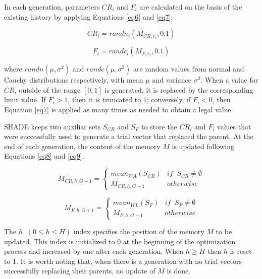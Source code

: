 \documentclass[review]{elsarticle}
\begin{document}
In each generation, parameters $CR_i$ and $F_i$ are calculated on the basis of the existing history by applying Equations \eqref{eq6} and \eqref{eq7}:

\begin{equation}
CR_i = randn_i(M_{CR,r_i}, 0.1)
\label{eq6}
\end{equation}

\begin{equation}
F_i = randc_i(M_{F,r_i}, 0.1)
\label{eq7}
\end{equation}

where $randn(\mu, \sigma^2)$ and $randc(\mu, \sigma^2)$ are random values from normal and Cauchy distributions respectively, with mean $\mu$ and variance $\sigma^2$. When a value for $CR_i$ outside of the range $[0,1]$ is generated, it is replaced by the corresponding limit value. If $F_i > 1$, then it is truncated to $1$; conversely, if $F_i < 0$, then Equation \eqref{eq7} is applied as many times as needed to obtain a legal value.

SHADE keeps two auxiliar sets $S_{CR}$ and $S_F$ to store the $CR_i$ and $F_i$ values that were successfully used to generate a trial vector that replaced the parent. At the end of each generation, the content of the memory $M$ is updated following Equations \eqref{eq8} and \eqref{eq9}.

\begin{equation}
M_{CR,h,G+1} = \left\{ \begin{array}{lc}
mean_{WA} (S_{CR}) &   if \;\; S_{CR} \neq \emptyset \\
M_{CR,h,G+1} &  otherwise
\end{array}
\right.
\label{eq8}
\end{equation}

\begin{equation}
M_{F,h,G+1} = \left\{ \begin{array}{lc}
mean_{WL} (S_{F}) &   if \;\; S_{F} \neq \emptyset \\
M_{F,h,G+1} &  otherwise
\end{array}
\right.
\label{eq9}
\end{equation}

The $h \;\; (0 \le h \le H)$ index specifies the position of the memory $M$ to be updated. This index is initialized to $0$ at the beginning of the optimization process and increased by one after each generation. When $h \ge H$ then $h$ is reset to 1. It is worth noting that, when there is a generation with no trial vectors successfully replacing their parents, no update of $M$ is done.
\end{document}
